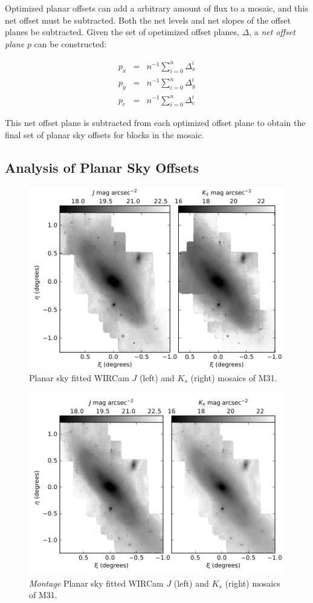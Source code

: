\documentclass[iop]{emulateapj}
\newcommand{\sw}[1]{\textit{#1}} %
\begin{document}
Optimized planar offsets can add a arbitrary amount of flux to a mosaic, and this net offset must be subtracted. Both the net levels and net slopes of the offset planes be subtracted. Given the set of opetimized offset planes, $\Delta$, a \emph{net offset plane} $p$ can be constructed:

\begin{eqnarray}
	p_x & = & n^{-1} \sum_{i=0}^n \Delta_x^i \\
	p_y & = & n^{-1} \sum_{i=0}^n \Delta_y^i \\
	p_c & = & n^{-1} \sum_{i=0}^n \Delta_c^i
\end{eqnarray}

\noindent This net offset plane is subtracted from each optimized offset plane to obtain the final set of planar sky offsets for blocks in the mosaic.

\subsection{Analysis of Planar Sky Offsets}

\begin{figure}[t]
	\centering
		\includegraphics[width=6in]{figs/planar_mosaics}
	\caption{Planar sky fitted WIRCam $J$ (left) and $K_s$ (right) mosaics of M31.}
	\label{fig:planar_mosaics}
\end{figure}


\begin{figure}[t]
	\centering
		\includegraphics[width=6in]{figs/montage_planar_mosaics}
	\caption{\sw{Montage} Planar sky fitted WIRCam $J$ (left) and $K_s$ (right) mosaics of M31.}
	\label{fig:montage_planar_mosaics}
\end{figure}


\end{document}
